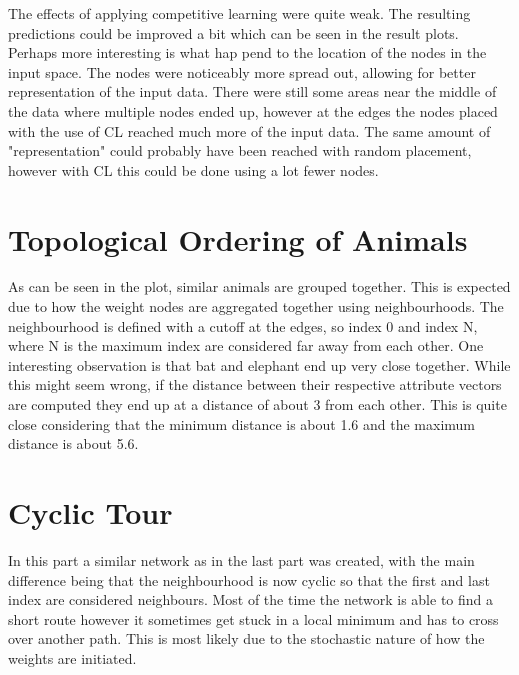 \documentclass{article}
\begin{document}
The effects of applying competitive learning were quite weak. The resulting predictions could be improved a bit which can be seen in the result plots. Perhaps more interesting is what hap pend to the location of the nodes in the input space. The nodes were noticeably more spread out, allowing for better representation of the input data. There were still some areas near the middle of the data where multiple nodes ended up, however at the edges the nodes placed with the use of CL reached much more of the input data. The same amount of "representation" could probably have been reached with random placement, however with CL this could be done using a lot fewer nodes.

\FloatBarrier
\section{Topological Ordering of Animals}
As can be seen in the plot, similar animals are grouped together. This is expected due to how the weight nodes are aggregated together using neighbourhoods. The neighbourhood is defined with a cutoff at the edges, so index 0 and index N, where N is the maximum index are considered far away from each other. One interesting observation is that bat and elephant end up very close together. While this might seem wrong, if the distance between their respective attribute vectors are computed they end up at a distance of about 3 from each other. This is quite close considering that the minimum distance is about 1.6 and the maximum distance is about 5.6.


\section{Cyclic Tour}
In this part  a similar network as in the last part was created, with the main difference being that the neighbourhood is now cyclic so that the first and last index are considered neighbours. Most of the time the network is able to find a short route however it sometimes get stuck in a local minimum and has to cross over another path. This is most likely due to the stochastic nature of how the weights are initiated. 

\end{document}
